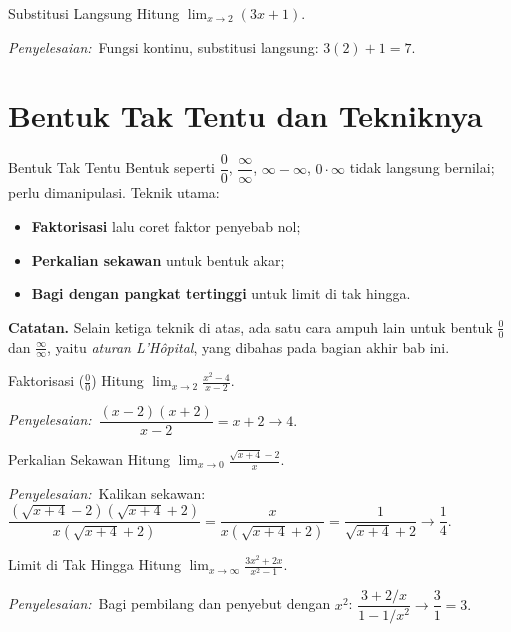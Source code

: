 \documentclass[11pt,a4paper]{report}
\theoremstyle{gaya}
\newcommand{\jawab}{\par\smallskip\noindent\textit{\textcolor{oranye}{Penyelesaian:}}\ }
\begin{document}
\begin{contoh}{Substitusi Langsung}
Hitung $\displaystyle\lim_{x\to2}(3x+1)$.

\jawab Fungsi kontinu, substitusi langsung: $3(2)+1=7.$
\end{contoh}

\section{Bentuk Tak Tentu dan Tekniknya}
\begin{konsep}{Bentuk Tak Tentu}
Bentuk seperti $\dfrac00$, $\dfrac{\infty}{\infty}$, $\infty-\infty$, $0\cdot\infty$ tidak langsung bernilai; perlu dimanipulasi. Teknik utama:
\begin{itemize}[leftmargin=*,topsep=2pt]
  \item \textbf{Faktorisasi} lalu coret faktor penyebab nol;
  \item \textbf{Perkalian sekawan} untuk bentuk akar;
  \item \textbf{Bagi dengan pangkat tertinggi} untuk limit di tak hingga.
\end{itemize}
\end{konsep}

\begin{catatan}
\textbf{Catatan.} Selain ketiga teknik di atas, ada satu cara ampuh lain untuk bentuk $\tfrac00$ dan $\tfrac\infty\infty$, yaitu \emph{aturan L'Hôpital}, yang dibahas pada bagian akhir bab ini.
\end{catatan}

\begin{contoh}{Faktorisasi ($\tfrac00$)}
Hitung $\displaystyle\lim_{x\to2}\frac{x^2-4}{x-2}$.

\jawab $\dfrac{(x-2)(x+2)}{x-2}=x+2\to4.$
\end{contoh}

\begin{contoh}{Perkalian Sekawan}
Hitung $\displaystyle\lim_{x\to0}\frac{\sqrt{x+4}-2}{x}$.

\jawab Kalikan sekawan: $\dfrac{(\sqrt{x+4}-2)(\sqrt{x+4}+2)}{x(\sqrt{x+4}+2)}=\dfrac{x}{x(\sqrt{x+4}+2)}=\dfrac{1}{\sqrt{x+4}+2}\to\dfrac14.$
\end{contoh}

\begin{contoh}{Limit di Tak Hingga}
Hitung $\displaystyle\lim_{x\to\infty}\frac{3x^2+2x}{x^2-1}$.

\jawab Bagi pembilang dan penyebut dengan $x^2$: $\dfrac{3+2/x}{1-1/x^2}\to\dfrac{3}{1}=3.$
\end{contoh}
\end{document}

